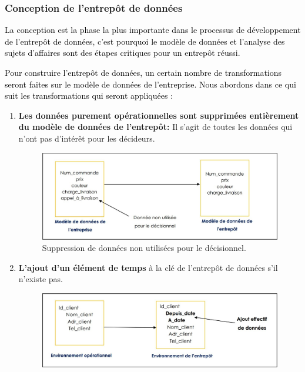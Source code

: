 \documentclass[a4paper,12pt]{report}
\begin{document}
\subsubsection{Conception de l’entrepôt de données}

\textcolor{black}{La conception est la phase la plus importante dans le processus de développement de l’entrepôt de données, c’est pourquoi le modèle de données et l’analyse des sujets d’affaires sont des étapes critiques pour un entrepôt réussi. }

\textcolor{black}{Pour construire l’entrepôt de données, un certain nombre de transformations seront faites sur le modèle de données de l’entreprise. Nous abordons dans ce qui suit les transformations qui seront appliquées :}

\begin{enumerate}
\item \textbf{Les données purement opérationnelles sont supprimées entièrement du modèle de données de l’entrepôt:} Il s’agit de toutes les données qui n’ont pas d’intérêt pour les décideurs.


\begin{figure}[h!]

\begin{center}
\includegraphics[width=0.7\linewidth]{./images/6}
\end{center}

\caption{Suppression de données non utilisées pour le décisionnel. \citep{inmon2000}}
\label{fig:6}

\end{figure}


\item \textbf{L’ajout d’un élément de temps} à la clé de l’entrepôt de données s’il n’existe pas.

\begin{figure}[H]
\begin{center}
\includegraphics[width=0.7\linewidth]{./images/7}
\end{center}


\end{figure}
\end{enumerate}
\end{document}
